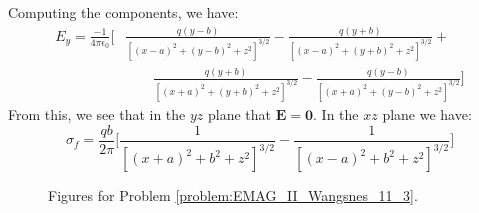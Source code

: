 \documentclass[crop=false,class=book,oneside]{standalone}
\begin{document}
\begin{solution}
\begin{equation}
                \end{equation}
                Computing the components, we have:
                \begin{equation}
                    \begin{split}
                        E_{y}=\frac{\minus{1}}{4\pi\epsilon_{0}}\Big[
                            &
                            \frac{q(y-b)}
                                 {[(x-a)^{2}+(y-b)^{2}+z^{2}]^{3/2}}-
                            \frac{q(y+b)}
                                 {[(x-a)^{2}+(y+b)^{2}+z^{2}]^{3/2}}+
                            \\
                            &\quad\quad
                            \frac{q(y+b)}
                                 {[(x+a)^{2}+(y+b)^{2}+z^{2}]^{3/2}}-
                            \frac{q(y-b)}
                                 {[(x+a)^{2}+(y-b)^{2}+z^{2}]^{3/2}}
                        \Big]
                    \end{split}
                \end{equation}
                From this, we see that in the $yz$ plane that
                $\mathbf{E}=\mathbf{0}$. In the $xz$ plane we have:
                \begin{equation}
                    \sigma_{f}=\frac{qb}{2\pi}\Big[
                        \frac{1}{[(x+a)^{2}+b^{2}+z^{2}]^{3/2}}-
                        \frac{1}{[(x-a)^{2}+b^{2}+z^{2}]^{3/2}}
                    \Big]
                \end{equation}
            \end{solution}
            \begin{figure}[H]
                \centering
                \captionsetup{type=figure}
                \begin{subfigure}[b]{0.49\textwidth}
                    \centering
                \end{subfigure}
                \begin{subfigure}[b]{0.49\textwidth}
                    \centering
                \end{subfigure}
                \caption{Figures for Problem
                         \ref{problem:EMAG_II_Wangsnes_11_3}.}
                \label{fig:problem:EMAG_II_Wangsnes_11_3}
            \end{figure}
\end{document}
